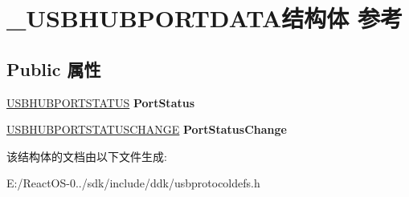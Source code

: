 \hypertarget{struct___u_s_b_h_u_b_p_o_r_t_d_a_t_a}{}\section{\+\_\+\+U\+S\+B\+H\+U\+B\+P\+O\+R\+T\+D\+A\+T\+A结构体 参考}
\label{struct___u_s_b_h_u_b_p_o_r_t_d_a_t_a}
\subsection*{Public 属性}
\begin{DoxyCompactItemize}
\item 
\mbox{\label{struct___u_s_b_h_u_b_p_o_r_t_d_a_t_a_af392a811ffbd1b116aba0162ae8c69a5}} 
\hyperlink{union___u_s_b_h_u_b_p_o_r_t_s_t_a_t_u_s}{U\+S\+B\+H\+U\+B\+P\+O\+R\+T\+S\+T\+A\+T\+US} {\bfseries Port\+Status}
\item 
\mbox{\label{struct___u_s_b_h_u_b_p_o_r_t_d_a_t_a_aa386ed5878899228d18c45296313072d}} 
\hyperlink{union___u_s_b_h_u_b_p_o_r_t_s_t_a_t_u_s_c_h_a_n_g_e}{U\+S\+B\+H\+U\+B\+P\+O\+R\+T\+S\+T\+A\+T\+U\+S\+C\+H\+A\+N\+GE} {\bfseries Port\+Status\+Change}
\end{DoxyCompactItemize}


该结构体的文档由以下文件生成\+:\begin{DoxyCompactItemize}
\item 
E\+:/\+React\+O\+S-\/0../sdk/include/ddk/usbprotocoldefs.\+h\end{DoxyCompactItemize}
